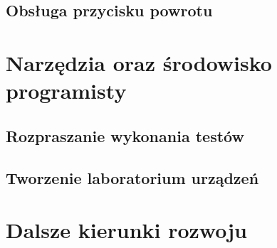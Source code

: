 \documentclass[a4paper]{article}
\begin{document}
\subsection{Obsługa przycisku powrotu}

\section{Narzędzia oraz środowisko programisty}

\subsection{Rozpraszanie wykonania testów}

\subsection{Tworzenie laboratorium urządzeń}

\section{Dalsze kierunki rozwoju}
\end{document}
